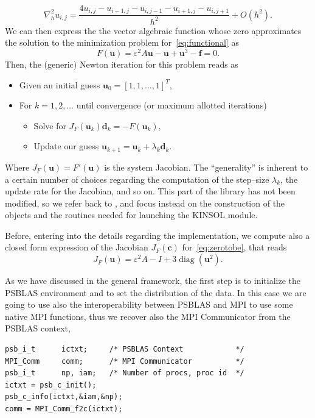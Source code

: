 \documentclass[twoside,a4paper]{refart}
\theoremstyle{definition}
\begin{document}
\begin{equation*}
\nabla^2_h u_{i,j} = \frac{4 u_{i,j} - u_{i-1,j} - u_{i,j-1} - u_{i+1,j} - u_{i,j+1} }{h^2} + O(h^2).
\end{equation*}
We can then express the the vector algebraic function whose zero approximates the solution to the minimization problem for~\eqref{eq:functional} as 
\begin{equation}\label{eq:zerotobe}
	F(\mathbf{u}) = \varepsilon^2 A \mathbf{u} - \mathbf{u} + \mathbf{u}^3 - \mathbf{f} = 0.
\end{equation}
Then, the (generic) Newton iteration for this problem reads as 
\begin{itemize}
	\item Given an initial guess $\mathbf{u}_0 = [1,1,\ldots,1]^T$,
	\item For $k=1,2,\ldots$ until convergence (or maximum allotted iterations)
	\begin{itemize}
		\item Solve for $J_F( \mathbf{u}_k ) \mathbf{d}_k = - F( \mathbf{u}_k )$,
		\item Update our guess $\mathbf{u}_{k+1} = \mathbf{u}_k + \lambda_k \mathbf{d}_k$.
	\end{itemize}
\end{itemize}
Where $J_F(\mathbf{u}) = F'(\mathbf{u})$ is the system Jacobian. The ``generality'' is inherent to a certain number of choices regarding the computation of the step--size $\lambda_k$, the update rate for the Jacobian, and so on. This part of the library has not been modified, so we refer back to \cite[Chapter~4]{kinsolguide}, and focus instead on the construction of the objects and the routines needed for launching the KINSOL module.

Before, entering into the details regarding the implementation, we compute also a closed form expression of the Jacobian $J_F(\mathbf{c})$ for~\eqref{eq:zerotobe}, that reads
\begin{equation}\label{eq:jacobian}
J_F(\mathbf{u}) = \varepsilon^2 A -I +3\operatorname{diag}(\mathbf{u}^2).
\end{equation}

As we have discussed in the general framework, the first step is to initialize the PSBLAS environment and to set the distribution of the data. In this case we are going to use also the interoperability between PSBLAS and MPI to use some native MPI functions, thus we recover also the MPI Communicator from the PSBLAS context,
\begin{lstlisting}[style=CStyle]
psb_i_t      ictxt;     /* PSBLAS Context            */
MPI_Comm     comm;      /* MPI Communicator          */
psb_i_t      np, iam;   /* Number of procs, proc id  */
ictxt = psb_c_init();
psb_c_info(ictxt,&iam,&np);
comm = MPI_Comm_f2c(ictxt);
\end{lstlisting}
\end{document}
